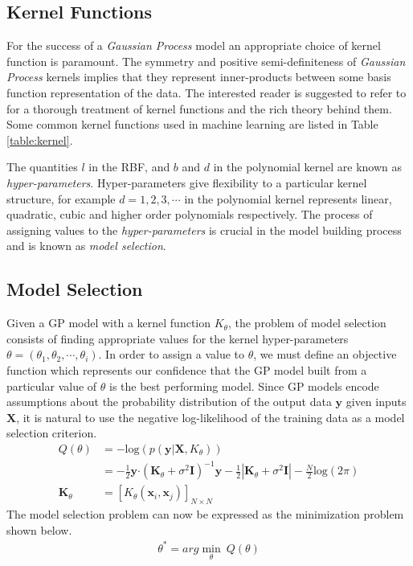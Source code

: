 \subsection{Kernel Functions}

For the success of a \emph{Gaussian Process} model an appropriate choice of kernel function is 
paramount. The symmetry and positive semi-definiteness of \emph{Gaussian Process} kernels implies 
that they represent inner-products between some basis function representation of the data. The 
interested reader is suggested to refer to 
\citet{Berlinet2004,Scholkopf:2001:LKS:559923,hofmann2008} for a thorough treatment of kernel 
functions and the rich theory behind them. Some common kernel functions used in machine learning 
are listed in Table \ref{table:kernel}. 

The quantities $l$ in the RBF, and $b$ and $d$ in the polynomial kernel are known as 
\emph{hyper-parameters}. Hyper-parameters give flexibility to a particular kernel structure, for 
example $d = 1, 2, 3, \cdots$ in the polynomial kernel represents linear, quadratic, cubic and 
higher order polynomials respectively. The process of assigning values to the 
\emph{hyper-parameters} is crucial in the model building process and is known as 
\emph{model selection}. 

\subsection{Model Selection}\label{sec:gpModelSelection}

Given a GP model with a kernel function $K_\theta$, the problem of model selection consists of 
finding appropriate values for the kernel hyper-parameters 
$\theta = \left(\theta_1, \theta_2, \cdots, \theta_i\right)$. In order to assign a value to 
$\theta$, we must define an objective function which represents our confidence that the GP model 
built from a particular value of $\theta$ is the best performing model. Since GP models encode 
assumptions about the probability distribution of the output data $\mathbf{y}$ given inputs 
$\mathbf{X}$, it is natural to use the negative log-likelihood of the training data as a model 
selection criterion. 
%
\begin{align*}
  Q(\theta) & = - \text{log}(p(\mathbf{y}|\mathbf{X}, K_\theta)) \\
            & = -\frac{1}{2} \mathbf{y}\boldsymbol{\cdot} (\mathbf{K}_\theta + \sigma^{2} \mathbf{I})^{-1} \mathbf{y} - \frac{1}{2}|\mathbf{K}_\theta + \sigma^{2} \mathbf{I}| - \frac{N}{2}\text{log}(2\pi) \\
  \mathbf{K}_\theta & = [K_{\theta}(\mathbf{x}_i, \mathbf{x}_j)]_{N \times N}
\end{align*}
%
The model selection problem can now be expressed as the minimization problem shown below.
%
\begin{align*}
\theta^* = arg\min_{\theta} \ Q(\theta)
\end{align*}

